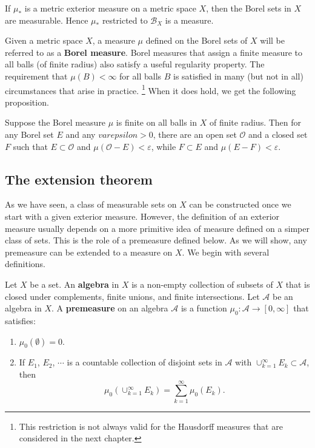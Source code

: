 \begin{theorem}
  If $\mu_*$ is a metric exterior measure on a metric space $X$, 
  then the Borel sets in $X$ are measurable.
  Hence $\mu_*$ restricted to $\mathcal B_X$ is a measure.
\end{theorem}

Given a metric space $X$, a measure $\mu$ defined on the Borel sets of $X$ will be referred to as a \textbf{Borel measure}.
Borel measures that assign a finite measure to all balls (of finite radius) also satisfy a useful regularity property. 
The requirement that $\mu(B) < \infty$ for all balls $B$ is satisfied in many (but not in all) circumstances that arise in practice.
\footnote{This restriction is not always valid for the Hausdorff measures that are considered in the next chapter.}
When it does hold, we get the following proposition.

\begin{proposition}
  Suppose the Borel measure $\mu$ is finite on all balls in $X$ of finite radius. 
  Then for any Borel set $E$ and any $varepsilon>0$, 
  there are an open set $\mathcal O$ and a closed set $F$ such that $E\subset\mathcal O$ and 
  $\mu(\mathcal O-E) < \varepsilon$, while $F\subset E$ and $\mu(E-F) < \varepsilon$.
\end{proposition}

\subsection{The extension theorem}

As we have seen, a class of measurable sets on $X$ can be constructed once we start with a given exterior measure.
However, the definition of an exterior measure usually depends on a more primitive idea of measure defined on a simper class of sets.
This is the role of a premeasure defined below.
As we will show, any premeasure can be extended to a measure on $X$. 
We begin with several definitions.

Let $X$ be a set. An \textbf{algebra} in $X$ is a non-empty collection of subsets of $X$ that is closed under complements, finite unions, and finite intersections.
Let $\mathcal A$ be an algebra in $X$. 
A \textbf{premeasure} on an algebra $\mathcal A$ is a function $\mu_0:\mathcal A\to[0,\infty]$ that satisfies:
\begin{enumerate}
  \item $\mu_0(\emptyset) = 0$.
  \item If $E_1$, $E_2$, $\cdots$ is a countable collection of disjoint sets in $\mathcal A$ with 
  $\cup_{k=1}^\infty E_k \subset\mathcal A$, then 
  \[
  \mu_0\left(\cup_{k=1}^\infty E_k\right) = \sum_{k=1}^\infty \mu_0(E_k).
  \]
\end{enumerate}

